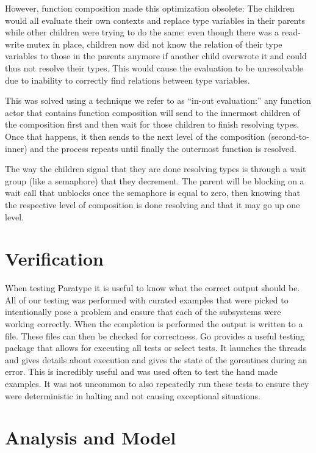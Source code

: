 \documentclass{acm_proc_article-sp}
\begin{document}
		However, function composition made this optimization obsolete: The
		children would all evaluate their own contexts and replace type
		variables in their parents while other children were trying to do the
		same: even though there was a read-write mutex in place, children now
		did not know the relation of their type variables to those in the
		parents anymore if another child overwrote it and could thus not
		resolve their types. This would cause the evaluation to be unresolvable
		due to inability to correctly find relations between type variables.

		This was solved using a technique we refer to as ``in-out evaluation:''
		any function actor that contains function composition will send to the
		innermost children of the composition first and then wait for those
		children to finish resolving types. Once that happens, it then sends
		to the next level of the composition (second-to-inner) and the process
		repeats until finally the outermost function is resolved.

		The way the children signal that they are done resolving types is
		through a wait group (like a semaphore) that they decrement. The parent
		will be blocking on a wait call that unblocks once the semaphore is
		equal to zero, then knowing that the respective level of composition is
		done resolving and that it may go up one level.

\section{Verification}
	When testing Paratype it is useful to know what the correct output should
	be. All of our testing was performed with curated examples that were picked
	to intentionally pose a problem and ensure that each of the subsystems were
	working correctly. When the completion is performed the output is written
	to a file. These files can then be checked for correctness. Go provides a
	useful testing package that allows for executing all tests or select tests.
	It launches the threads and gives details about execution and gives the
	state of the goroutines during an error. This is incredibly useful and was
	used often to test the hand made examples. It was not uncommon to also
	repeatedly run these tests to ensure they were deterministic in halting and
	not causing exceptional situations.  
	
\section{Analysis and Model}
\end{document}
